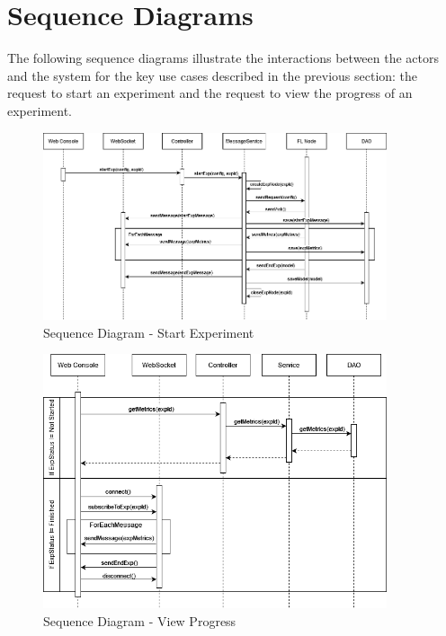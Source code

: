 \section{Sequence Diagrams}
The following sequence diagrams illustrate the interactions between the actors and the system for the key use
cases described in the previous section: the request to start an experiment and the request to view the progress
of an experiment.
\begin{figure}[ht!]
    \centering
    \includegraphics[width=0.9\textwidth]{images/2_analisys/sequence-diagram-start-exp.png}
    \caption{Sequence Diagram - Start Experiment}
    \label{fig:sequence_diagram_start_exp}
\end{figure}

\begin{figure}[ht!]
    \centering
    \includegraphics[width=0.9\textwidth]{images/2_analisys/sequence-diagram-view-progress.png}
    \caption{Sequence Diagram - View Progress}
    \label{fig:sequence_diagram_view_progress}
\end{figure}


